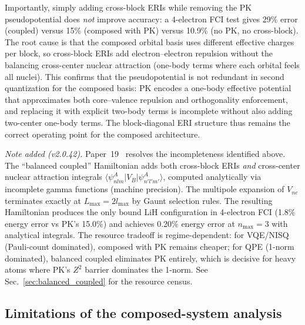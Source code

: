 \documentclass[aps,pra,twocolumn,superscriptaddress,longbibliography]{revtex4-2}
\begin{document}
Importantly, simply adding cross-block ERIs while removing the PK
pseudopotential does \emph{not} improve accuracy: a 4-electron FCI
test gives 29\% error (coupled) versus 15\% (composed with PK)
versus 10.9\% (no PK, no cross-block).  The root cause is that the
composed orbital basis uses different effective charges per block,
so cross-block ERIs add electron--electron repulsion without the
balancing cross-center nuclear attraction (one-body terms where
each orbital feels all nuclei).  This confirms that the
pseudopotential is not redundant in second quantization for the
composed basis: PK encodes a one-body effective potential that
approximates both core--valence repulsion and orthogonality
enforcement, and replacing it with explicit two-body terms is
incomplete without also adding two-center one-body terms.
The block-diagonal ERI structure thus remains the correct
operating point for the composed architecture.

\textit{Note added (v2.0.42).}
Paper~19~\cite{loutey_paper19} resolves the incompleteness identified above.
The ``balanced coupled'' Hamiltonian adds both cross-block ERIs
\emph{and} cross-center nuclear attraction integrals
$\langle \psi_{nlm}^A | V_B | \psi_{n'l'm'}^A \rangle$, computed
analytically via incomplete gamma functions (machine precision).
The multipole expansion of $V_{ne}$ terminates exactly at
$L_{\max} = 2 l_{\max}$ by Gaunt selection rules.  The resulting
Hamiltonian produces the only bound LiH configuration in
4-electron FCI (1.8\% energy error vs PK's 15.0\%) and achieves
0.20\% energy error at $n_{\max} = 3$ with analytical integrals.
The resource tradeoff is regime-dependent: for VQE/NISQ (Pauli-count
dominated), composed with PK remains cheaper; for QPE (1-norm
dominated), balanced coupled eliminates PK entirely, which is
decisive for heavy atoms where PK's $Z^2$ barrier dominates
the 1-norm.  See Sec.~\ref{sec:balanced_coupled} for the
resource census.


\subsection{Limitations of the composed-system analysis}
\label{sec:composed_limitations}
\end{document}

